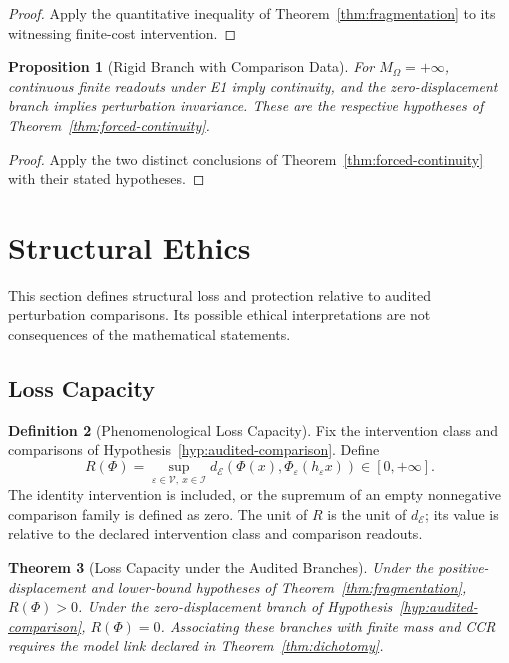 \documentclass[11pt,a4paper]{article}
\theoremstyle{plain}
\newtheorem{theorem}{Theorem}[section]
\newtheorem{proposition}[theorem]{Proposition}
\theoremstyle{definition}
\newtheorem{definition}[theorem]{Definition}
\theoremstyle{remark}
\begin{document}
\begin{proof}
Apply the quantitative inequality of Theorem~\ref{thm:fragmentation} to its witnessing finite-cost intervention.
\end{proof}

\begin{proposition}[Rigid Branch with Comparison Data]
For $M_\Omega=+\infty$, continuous finite readouts under E1 imply continuity, and the zero-displacement branch implies perturbation invariance. These are the respective hypotheses of Theorem~\ref{thm:forced-continuity}.
\end{proposition}

\begin{proof}
Apply the two distinct conclusions of Theorem~\ref{thm:forced-continuity} with their stated hypotheses.
\end{proof}

\section{Structural Ethics}

This section defines structural loss and protection relative to audited perturbation comparisons. Its possible ethical interpretations are not consequences of the mathematical statements.

\subsection{Loss Capacity}

\begin{definition}[Phenomenological Loss Capacity]\label{def:loss-capacity}
Fix the intervention class and comparisons of Hypothesis~\ref{hyp:audited-comparison}. Define
\[
R(\Phi)=\sup_{\varepsilon\in\mathcal V,\ x\in\mathcal I}
d_{\mathcal E}(\Phi(x),\Phi_\varepsilon(h_\varepsilon x))\in[0,+\infty].
\]
The identity intervention is included, or the supremum of an empty nonnegative comparison family is defined as zero. The unit of $R$ is the unit of $d_{\mathcal E}$; its value is relative to the declared intervention class and comparison readouts.
\end{definition}

\begin{theorem}[Loss Capacity under the Audited Branches]\label{thm:loss}
Under the positive-displacement and lower-bound hypotheses of Theorem~\ref{thm:fragmentation}, $R(\Phi)>0$. Under the zero-displacement branch of Hypothesis~\ref{hyp:audited-comparison}, $R(\Phi)=0$. Associating these branches with finite mass and CCR requires the model link declared in Theorem~\ref{thm:dichotomy}.
\end{theorem}
\end{document}
